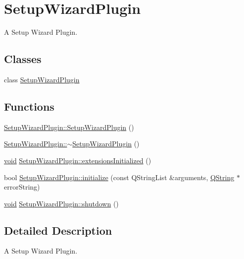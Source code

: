 \hypertarget{group___setup_wizard_plugin}{\section{Setup\-Wizard\-Plugin}
\label{group___setup_wizard_plugin}
}


A Setup Wizard Plugin.  


\subsection*{Classes}
\begin{DoxyCompactItemize}
\item 
class \hyperlink{class_setup_wizard_plugin}{Setup\-Wizard\-Plugin}
\end{DoxyCompactItemize}
\subsection*{Functions}
\begin{DoxyCompactItemize}
\item 
\hyperlink{group___setup_wizard_plugin_ga3aa7966c2f38a762e4669751ccdf470a}{Setup\-Wizard\-Plugin\-::\-Setup\-Wizard\-Plugin} ()
\item 
\hyperlink{group___setup_wizard_plugin_ga57537cb52f05ade3a3fbe59ca00d187b}{Setup\-Wizard\-Plugin\-::$\sim$\-Setup\-Wizard\-Plugin} ()
\item 
\hyperlink{group___u_a_v_objects_plugin_ga444cf2ff3f0ecbe028adce838d373f5c}{void} \hyperlink{group___setup_wizard_plugin_gaa612baf865ac69fa057ec64987c86ff4}{Setup\-Wizard\-Plugin\-::extensions\-Initialized} ()
\item 
bool \hyperlink{group___setup_wizard_plugin_ga2ea2069466d237ee561815a5a00f7a4e}{Setup\-Wizard\-Plugin\-::initialize} (const Q\-String\-List \&arguments, \hyperlink{group___u_a_v_objects_plugin_gab9d252f49c333c94a72f97ce3105a32d}{Q\-String} $\ast$error\-String)
\item 
\hyperlink{group___u_a_v_objects_plugin_ga444cf2ff3f0ecbe028adce838d373f5c}{void} \hyperlink{group___setup_wizard_plugin_ga982d4e38aff329d0dfc32506a4eb5539}{Setup\-Wizard\-Plugin\-::shutdown} ()
\end{DoxyCompactItemize}


\subsection{Detailed Description}
A Setup Wizard Plugin. 

